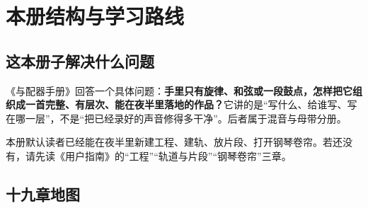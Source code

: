 \chapter*{本册结构与学习路线}
\label{ch:plan}

\section*{这本册子解决什么问题}

《与配器手册》回答一个具体问题：\textbf{手里只有旋律、和弦或一段鼓点，怎样把它组织成一首完整、有层次、能在夜半里落地的作品？}它讲的是“写什么、给谁写、写在哪一层”，不是“把已经录好的声音修得多干净”。后者属于混音与母带分册。

本册默认读者已经能在夜半里新建工程、建轨、放片段、打开钢琴卷帘。若还没有，请先读《用户指南》的“工程”“轨道与片段”“钢琴卷帘”三章。

\section*{十九章地图}

